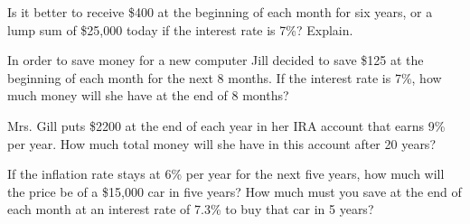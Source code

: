         \begin{puzzle}
        Is it better to receive \$400 at the beginning of each month for six years, or a lump sum of \$25,000 today if the interest rate is 7\%? Explain.
        \end{puzzle}
        
        \begin{puzzle}
        In order to save money for a new computer Jill decided to save \$125 at the beginning of each month for the next 8 months. If the interest rate is 7\%, how much money will she have at the end of 8 months?
        \end{puzzle}
        
        \begin{puzzle}
        Mrs. Gill puts \$2200 at the end of each year in her IRA account that earns 9\% per year. How much total money will she have in this account after 20 years?
        \end{puzzle}
        
        \begin{puzzle}
        If the inflation rate stays at 6\% per year for the next five years, how much will the price be of a \$15,000 car in five years? How much must you save at the end of each month at an interest rate of 7.3\% to buy that car in 5 years?
        \end{puzzle}
        